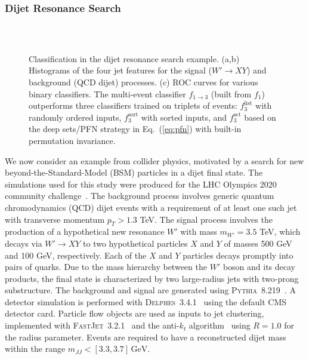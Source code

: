 \documentclass[aps,prx,reprint,preprintnumbers,superscriptaddress,nofootinbib,longbibliography,floatfix]{revtex4-2}
\DeclareRobustCommand{\Eq}[1]{Eq.~(\ref{eq:#1})}
\begin{document}
\subsubsection{Dijet Resonance Search}
\label{sec:manyfromone_bsm}

 \begin{figure*}[t]
 \centering
\begin{minipage}[t]{0.95\columnwidth}
 \\
  \end{minipage}
  $\qquad$
  \begin{minipage}[t]{0.95\columnwidth}
 \end{minipage}
 \caption{Classification in the dijet resonance search example.  (a,b)  Histograms of the four jet features for the signal ($W' \to X Y$) and background (QCD dijet) processes.  
 (c) ROC curves for various binary classifiers.  The multi-event classifier $f_{1 \to 3}$ (built from $f_1$) outperforms three classifiers trained on triplets of events:  $f_3^\text{list}$ with randomly ordered inputs, $f_3^\text{sort}$ with sorted inputs, and $f_3^\text{set}$ based on the deep sets/PFN strategy in \Eq{pfn} with built-in permutation invariance.}
 \label{fig:BSM}
 \end{figure*}


We now consider an example from collider physics, motivated by a search for new beyond-the-Standard-Model (BSM) particles in a dijet final state.
%
The simulations used for this study were produced for the LHC Olympics 2020 community challenge~\cite{gregor_kasieczka_2019_2629073}.
%
The background process involves generic quantum chromodynamics (QCD) dijet events with a requirement of at least one such jet with transverse momentum $p_T>1.3$ TeV.
%
The signal process involves the production of a hypothetical new resonance $W'$ with mass $m_{W'}=3.5$ TeV, which decays via $W'\rightarrow XY$ to two hypothetical particles $X$ and $Y$ of masses 500 GeV and 100 GeV, respectively.
%
Each of the $X$ and $Y$ particles decays promptly into pairs of quarks.
%
Due to the mass hierarchy between the $W'$ boson and its decay products, the final state is characterized by two large-radius jets with two-prong substructure.
%
The background and signal are generated using \textsc{Pythia}~8.219~\cite{Sjostrand:2006za,Sjostrand:2007gs}.
%
A detector simulation is performed with \textsc{Delphes}~3.4.1~\cite{deFavereau:2013fsa,Mertens:2015kba,Selvaggi:2014mya} using the default CMS detector card.
%
Particle flow objects are used as inputs to jet clustering, implemented with \textsc{FastJet}~3.2.1~\cite{Cacciari:2011ma,Cacciari:2005hq} and the anti-$k_t$ algorithm~\cite{Cacciari:2008gp} using $R=1.0$ for the radius parameter.
%
Events are required to have a reconstructed dijet mass within the range $m_{JJ} < [3.3,3.7]\,\text{GeV}$.
 
\end{document}
